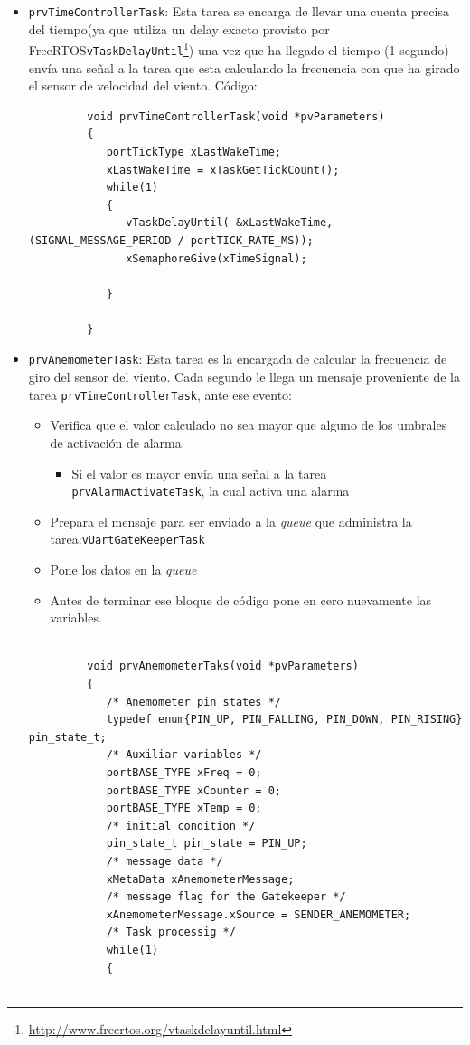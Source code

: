 \documentclass[10pt]{article}
\begin{document}
\begin{itemize}
   \item \verb|prvTimeControllerTask|: Esta tarea se encarga de llevar una cuenta precisa del tiempo(ya que utiliza un delay exacto provisto por FreeRTOS\texttrademark \verb|vTaskDelayUntil|\footnote{\url{http://www.freertos.org/vtaskdelayuntil.html}}) una vez que ha llegado el tiempo (1 segundo) envía una
      señal a la tarea que esta calculando la frecuencia con que ha girado el sensor de velocidad del viento. Código:
      \begin{verbatim}
         void prvTimeControllerTask(void *pvParameters)
         {
            portTickType xLastWakeTime;
            xLastWakeTime = xTaskGetTickCount();
            while(1)
            {
               vTaskDelayUntil( &xLastWakeTime, (SIGNAL_MESSAGE_PERIOD / portTICK_RATE_MS));
               xSemaphoreGive(xTimeSignal);

            }

         }
      \end{verbatim}
   \item\verb|prvAnemometerTask|: Esta tarea es la encargada de calcular la frecuencia de giro del sensor del viento. Cada segundo le llega un mensaje proveniente de la tarea \verb|prvTimeControllerTask|, ante ese evento:
      \begin{itemize}
         \item Verifica que el valor calculado no sea mayor que alguno de los umbrales de activación de alarma
            \begin{itemize}
               \item Si el valor es mayor envía una señal a la tarea \verb|prvAlarmActivateTask|, la cual activa una alarma
            \end{itemize}
         \item Prepara el mensaje para ser enviado a la \textit{queue} que administra la tarea:\verb|vUartGateKeeperTask|
         \item Pone los datos en la \textit{queue}
         \item Antes de terminar ese bloque de código pone en cero nuevamente las variables.
      \end{itemize}
      \begin{verbatim}
         
         void prvAnemometerTaks(void *pvParameters)
         {
            /* Anemometer pin states */
            typedef enum{PIN_UP, PIN_FALLING, PIN_DOWN, PIN_RISING} pin_state_t;
            /* Auxiliar variables */
            portBASE_TYPE xFreq = 0;
            portBASE_TYPE xCounter = 0;
            portBASE_TYPE xTemp = 0;
            /* initial condition */
            pin_state_t pin_state = PIN_UP;
            /* message data */
            xMetaData xAnemometerMessage;
            /* message flag for the Gatekeeper */
            xAnemometerMessage.xSource = SENDER_ANEMOMETER;
            /* Task processig */
            while(1)
            {


\end{verbatim}
\end{itemize}
\end{document}
